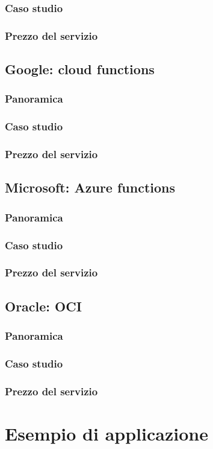 \documentclass[a4paper]{article}
\begin{document}
	\subsubsection{Caso studio}
	
	\subsubsection{Prezzo del servizio}
	
	\subsection{Google: cloud functions}
	
	\subsubsection{Panoramica}
	
	\subsubsection{Caso studio}
	
	\subsubsection{Prezzo del servizio}
	
	\subsection{Microsoft: Azure functions}
	
	\subsubsection{Panoramica}
	
	\subsubsection{Caso studio}
	
	\subsubsection{Prezzo del servizio}
	
	\subsection{Oracle: OCI}
	
	\subsubsection{Panoramica}
	
	\subsubsection{Caso studio}
	
	\subsubsection{Prezzo del servizio}
	
	\section{Esempio di applicazione}	
\end{document}
